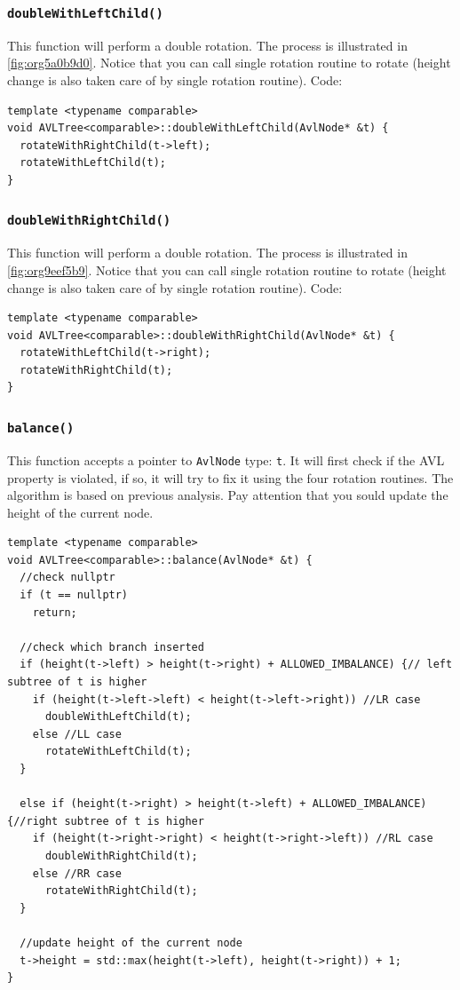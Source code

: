 \documentclass[12pt]{book}
\begin{document}
\subsubsection{\texttt{doubleWithLeftChild()}}
\label{sec:orgf344199}
This function will perform a double rotation. The process is illustrated in \ref{fig:org5a0b9d0}. Notice that you can call single rotation routine to rotate (height change is also taken care of by single rotation routine). Code:
\begin{verbatim}
template <typename comparable>
void AVLTree<comparable>::doubleWithLeftChild(AvlNode* &t) {
  rotateWithRightChild(t->left);
  rotateWithLeftChild(t);
}
\end{verbatim}
\subsubsection{\texttt{doubleWithRightChild()}}
\label{sec:orgc2d093f}
This function will perform a double rotation. The process is illustrated in \ref{fig:org9eef5b9}. Notice that you can call single rotation routine to rotate (height change is also taken care of by single rotation routine). Code:
\begin{verbatim}
template <typename comparable>
void AVLTree<comparable>::doubleWithRightChild(AvlNode* &t) {
  rotateWithLeftChild(t->right);
  rotateWithRightChild(t);
}
\end{verbatim}
\subsubsection{\texttt{balance()}}
\label{sec:org21ca51c}
This function accepts a pointer to \texttt{AvlNode} type: \texttt{t}. It will first check if the AVL property is violated, if so, it will try to fix it using the four rotation routines. The algorithm is based on previous analysis. Pay attention that you sould update the height of the current node.
\begin{verbatim}
template <typename comparable>
void AVLTree<comparable>::balance(AvlNode* &t) {
  //check nullptr
  if (t == nullptr)
    return;

  //check which branch inserted
  if (height(t->left) > height(t->right) + ALLOWED_IMBALANCE) {// left subtree of t is higher
    if (height(t->left->left) < height(t->left->right)) //LR case
      doubleWithLeftChild(t);
    else //LL case
      rotateWithLeftChild(t);
  }

  else if (height(t->right) > height(t->left) + ALLOWED_IMBALANCE) {//right subtree of t is higher 
    if (height(t->right->right) < height(t->right->left)) //RL case
      doubleWithRightChild(t);
    else //RR case
      rotateWithRightChild(t);
  }

  //update height of the current node
  t->height = std::max(height(t->left), height(t->right)) + 1;
}
\end{verbatim}
\end{document}
